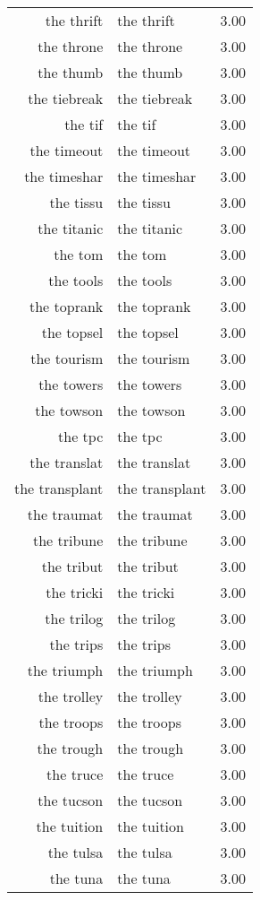 \begin{table}[ht]
\begin{tabular}{rlr}
  the thrift & the thrift & 3.00 \\ 
  the throne & the throne & 3.00 \\ 
  the thumb & the thumb & 3.00 \\ 
  the tiebreak & the tiebreak & 3.00 \\ 
  the tif & the tif & 3.00 \\ 
  the timeout & the timeout & 3.00 \\ 
  the timeshar & the timeshar & 3.00 \\ 
  the tissu & the tissu & 3.00 \\ 
  the titanic & the titanic & 3.00 \\ 
  the tom & the tom & 3.00 \\ 
  the tools & the tools & 3.00 \\ 
  the toprank & the toprank & 3.00 \\ 
  the topsel & the topsel & 3.00 \\ 
  the tourism & the tourism & 3.00 \\ 
  the towers & the towers & 3.00 \\ 
  the towson & the towson & 3.00 \\ 
  the tpc & the tpc & 3.00 \\ 
  the translat & the translat & 3.00 \\ 
  the transplant & the transplant & 3.00 \\ 
  the traumat & the traumat & 3.00 \\ 
  the tribune & the tribune & 3.00 \\ 
  the tribut & the tribut & 3.00 \\ 
  the tricki & the tricki & 3.00 \\ 
  the trilog & the trilog & 3.00 \\ 
  the trips & the trips & 3.00 \\ 
  the triumph & the triumph & 3.00 \\ 
  the trolley & the trolley & 3.00 \\ 
  the troops & the troops & 3.00 \\ 
  the trough & the trough & 3.00 \\ 
  the truce & the truce & 3.00 \\ 
  the tucson & the tucson & 3.00 \\ 
  the tuition & the tuition & 3.00 \\ 
  the tulsa & the tulsa & 3.00 \\ 
  the tuna & the tuna & 3.00 \\ 

\end{tabular}
\end{table}

